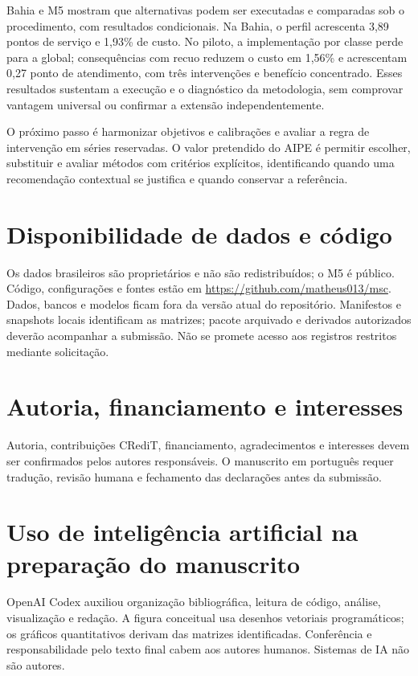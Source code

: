 \documentclass[preprint,12pt]{elsarticle}
\begin{document}
Bahia e M5 mostram que alternativas podem ser executadas e comparadas sob o procedimento, com resultados condicionais. Na Bahia, o perfil acrescenta 3,89 pontos de serviço e 1,93\% de custo. No piloto, a implementação por classe perde para a global; consequências com recuo reduzem o custo em 1,56\% e acrescentam 0,27 ponto de atendimento, com três intervenções e benefício concentrado. Esses resultados sustentam a execução e o diagnóstico da metodologia, sem comprovar vantagem universal ou confirmar a extensão independentemente.

O próximo passo é harmonizar objetivos e calibrações e avaliar a regra de intervenção em séries reservadas. O valor pretendido do AIPE é permitir escolher, substituir e avaliar métodos com critérios explícitos, identificando quando uma recomendação contextual se justifica e quando conservar a referência.

\section*{Disponibilidade de dados e código}
Os dados brasileiros são proprietários e não são redistribuídos; o M5 é público. Código, configurações e fontes estão em \url{https://github.com/matheus013/msc}. Dados, bancos e modelos ficam fora da versão atual do repositório. Manifestos e snapshots locais identificam as matrizes; pacote arquivado e derivados autorizados deverão acompanhar a submissão. Não se promete acesso aos registros restritos mediante solicitação.

\section*{Autoria, financiamento e interesses}
Autoria, contribuições CRediT, financiamento, agradecimentos e interesses devem ser confirmados pelos autores responsáveis. O manuscrito em português requer tradução, revisão humana e fechamento das declarações antes da submissão.

\section*{Uso de inteligência artificial na preparação do manuscrito}
OpenAI Codex auxiliou organização bibliográfica, leitura de código, análise, visualização e redação. A figura conceitual usa desenhos vetoriais programáticos; os gráficos quantitativos derivam das matrizes identificadas. Conferência e responsabilidade pelo texto final cabem aos autores humanos. Sistemas de IA não são autores.



\end{document}
